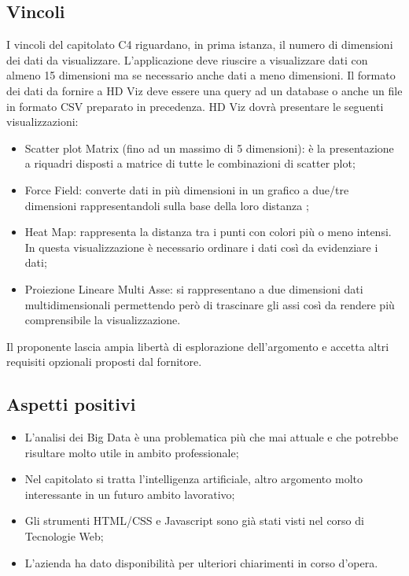 \subsection{Vincoli}
I vincoli del capitolato C4 riguardano, in prima istanza, il numero di dimensioni dei dati da visualizzare. L'applicazione deve riuscire a visualizzare dati con almeno 15 dimensioni ma se necessario anche dati a meno dimensioni. 
Il formato dei dati da fornire a HD Viz deve essere una query ad un database o anche un file in formato CSV preparato in precedenza.
HD Viz dovrà presentare le seguenti visualizzazioni: 
\begin{itemize}
\item Scatter plot Matrix (fino ad un massimo di 5 dimensioni): è la presentazione a riquadri disposti a matrice di tutte le combinazioni di scatter plot; 
\item Force Field: converte dati in più dimensioni in un grafico a due/tre dimensioni rappresentandoli sulla base della loro distanza ; 
\item Heat Map: rappresenta la distanza tra i punti con colori più o meno intensi. In questa visualizzazione è necessario ordinare i dati così da evidenziare i dati; 
\item Proiezione Lineare Multi Asse: si rappresentano a due dimensioni dati multidimensionali permettendo però di trascinare gli assi così da rendere più comprensibile la visualizzazione.  
\end{itemize} 
Il proponente lascia ampia libertà di esplorazione dell'argomento e accetta altri requisiti opzionali proposti dal fornitore.

\subsection{Aspetti positivi}
\begin{itemize}
\item L'analisi dei Big Data è una problematica più che mai attuale e che potrebbe risultare molto utile in ambito professionale;
\item Nel capitolato si tratta l'intelligenza artificiale, altro argomento molto interessante in un futuro ambito lavorativo;
\item Gli strumenti HTML/CSS e Javascript sono già stati visti nel corso di Tecnologie Web;
\item L'azienda ha dato disponibilità per ulteriori chiarimenti in corso d'opera.
\end{itemize}

